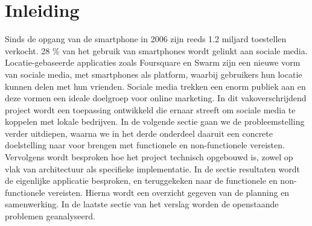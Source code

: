\chapter{Inleiding}

Sinds de opgang van de smartphone in 2006 zijn reeds 1.2 miljard toestellen verkocht\cite{smartphone_sales}. 28 \% van het gebruik van smartphones wordt gelinkt aan sociale media. Locatie-gebaseerde applicaties zoals Foursquare\cite{foursquare} en Swarm\cite{swarm} zijn een nieuwe vorm van sociale media, met smartphones als platform, waarbij gebruikers hun locatie kunnen delen met hun vrienden.
Sociale media trekken een enorm publiek aan en deze vormen een ideale doelgroep voor online marketing. 
In dit vakoverschrijdend project wordt een toepassing ontwikkeld die ernaar streeft om sociale media te koppelen met lokale bedrijven. 
In de volgende sectie gaan we de probleemstelling verder uitdiepen, waarna we in het derde onderdeel  daaruit een concrete doelstelling naar voor brengen met functionele en non-functionele vereisten. Vervolgens wordt besproken hoe het project technisch opgebouwd is, zowel op vlak van architectuur als specifieke implementatie. In de sectie resultaten wordt de eigenlijke applicatie besproken, en teruggekeken naar de functionele en non-functionele vereisten. Hierna wordt een overzicht gegeven van de planning en samenwerking. In de laatste sectie van het verslag worden de openstaande problemen geanalyseerd.